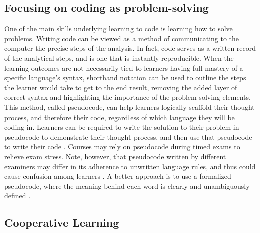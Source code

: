 \subsection{Focusing on coding as problem-solving}

One of the main skills underlying learning to code is learning how to solve problems. 
Writing code can be viewed as a method of communicating to the computer the precise steps of the analysis.
In fact, code serves as a written record of the analytical steps, and is one that is instantly reproducible.
When the learning outcomes are not necessarily tied to learners having full mastery of a specific language's syntax, shorthand notation can be used to outline the steps the learner would take to get to the end result, removing the added layer of correct syntax and highlighting the importance of the problem-solving elements.
This method, called pseudocode, can help learners logically scaffold their thought process, and therefore their code, regardless of which language they will be coding in.
Learners can be required to write the solution to their problem in pseudocode to demonstrate their thought process, and then use that pseudocode to write their code \citep[e.g.,][]{olsen_using_2005}.
Courses may rely on pseudocode during timed exams to relieve exam stress.
Note, however, that pseudocode written by different examiners may differ in its adherence to unwritten language rules, and thus could cause confusion among learners \citep{cutts_code_2014}. 
A better approach is to use a formalized pseudocode, where the meaning behind each word is clearly and unambiguously defined \citep{cutts_code_2014}.

\subsection{Cooperative Learning} 

